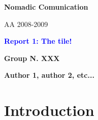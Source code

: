 \documentclass[12pt]{article}
\begin{document}
\begin{titlepage}
\begin{figure}[ht]
	\end{figure}
	{
	\large \bfseries Nomadic Comunication\par
	AA 2008-2009
	}\par
	\vspace{1.5cm}
	{
	\Large \bfseries \textcolor{blue}{Report 1: The tile!} \par
	}
	\vspace{1.0cm}
	{
	\large \bfseries {Group N. XXX} \par
	}
	\vspace{0.3cm}
	{
	\large \bfseries {Author 1, author 2, etc...}
	}
	\vspace{1.0cm}
	\begin{abstract}
	\end{abstract}
\end{titlepage}

\thispagestyle{empty}
\tableofcontents
\clearpage
\setcounter{page}{1}

%
%

\section{Introduction} \label{intro}
	
\end{document}
